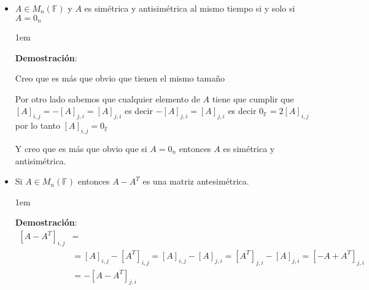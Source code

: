 \documentclass[12pt, fleqn]{report}                             %
\newenvironment{SmallIndentation}[1][0.75em]                    %
    {\begin{adjustwidth}{#1}{}\begin{footnotesize}}                 %
    {\end{footnotesize}\end{adjustwidth}}                           %
\begin{document}
\begin{itemize}
\begin{SmallIndentation}[1em]
                            \end{SmallIndentation}

                        \item $A \in M_{n}(\mathbb{F})$ y $A$ es simétrica y antisimétrica al mismo tiempo
                            si y solo si $A = 0_n$

                            \begin{SmallIndentation}[1em]
                                \textbf{Demostración}:

                                Creo que es más que obvio que tienen el mismo tamaño

                                Por otro lado sabemos que cualquier elemento de $A$ tiene que cumplir
                                que $[A]_{i,j}=-[A]_{j,i} = [A]_{j,i}$ es decir $-[A]_{j,i} = [A]_{j,i}$
                                es decir $0_{\mathbb{F}}=2[A]_{i,j}$ por lo tanto $[A]_{i,j}=0_\mathbb{F}$

                                Y creo que es más que obvio que si $A=0_n$ entonces $A$ es simétrica y
                                antisimétrica.

                            \end{SmallIndentation}


                        \item Si $A \in M_{n}(\mathbb{F})$ entonces $A-A^T$ es una matriz antesimétrica. 

                            \begin{SmallIndentation}[1em]
                                \textbf{Demostración}:
                                \begin{equation*}
                                \begin{split}
                                    [A-A^T]_{i,j}   &=                              \\
                                                    &=  [A]_{i,j} - [A^T]_{i,j}    
                                                     =  [A]_{i,j} - [A]_{j,i}    
                                                     =  [A^T]_{j,i} - [A]_{j,i}    
                                                     =  [-A+A^T]_{j, i}             \\
                                                    &= -[A-A^T]_{j, i}
                                \end{split}
                                \end{equation*}

                            \end{SmallIndentation}

                    \end{itemize}
\end{document}
